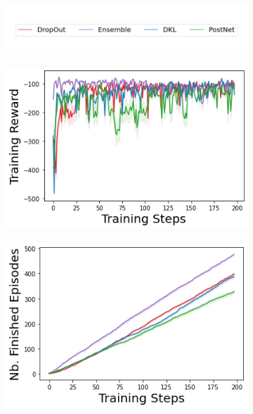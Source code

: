 \begin{figure}
    \centering
        \begin{subfigure}{.5\textwidth}
        \includegraphics[width=\textwidth]{sections/011_icml2022/resources/legend.png}
    \end{subfigure}
    \vspace{-5mm}
    
    \begin{subfigure}{.24\textwidth}
        \includegraphics[width=\textwidth]{sections/011_icml2022/resources/acrobot-training_total_reward-training-model.png}
    \end{subfigure}
    \begin{subfigure}{.24\textwidth}
        \includegraphics[width=\textwidth]{sections/011_icml2022/resources/acrobot-n_finished_training_episodes-training-model.png}  

\end{subfigure}
\end{figure}

